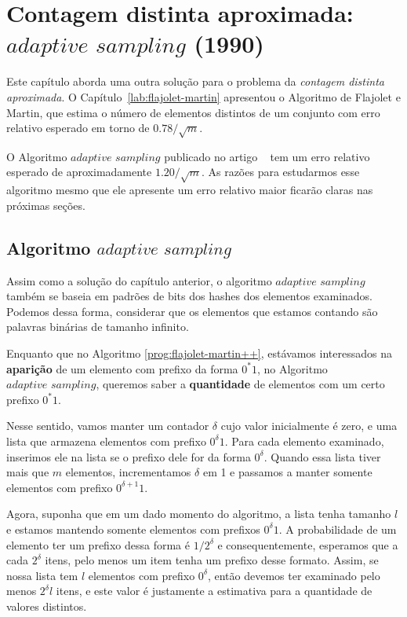 \newcommand{\asampling}{\textit{adaptive sampling}}

\chapter{Contagem distinta aproximada: $\asampling$ (1990)}

Este capítulo aborda uma outra solução para o problema da \textit{contagem distinta aproximada}. O 
Capítulo~\ref{lab:flajolet-martin} apresentou o Algoritmo de Flajolet e Martin, que estima o número de elementos 
distintos de um conjunto com erro relativo esperado em torno de $0.78 / \sqrt{m}$. 

O Algoritmo $\asampling$ publicado no artigo ~\citep{adptive:sampling:90} tem um erro relativo esperado de 
aproximadamente $1.20 / \sqrt{m}$. As razões para estudarmos esse algoritmo mesmo que ele apresente um erro relativo 
maior ficarão claras nas próximas seções.

\section{Algoritmo $\asampling$}
\label{lab:chapter:04:01}

Assim como a solução do capítulo anterior, o algoritmo $\asampling$ também se baseia em padrões de bits dos hashes dos 
elementos examinados. Podemos dessa forma, considerar que os elementos que estamos contando são palavras binárias de 
tamanho infinito. 

Enquanto que no Algoritmo \ref{prog:flajolet-martin++}, estávamos interessados na \textbf{aparição} de um elemento com 
prefixo da forma $0^*1$, no Algoritmo $\asampling$, queremos saber a \textbf{quantidade} de elementos com um certo 
prefixo $0^*1$.

Nesse sentido, vamos manter um contador $\delta$ cujo valor inicialmente é zero, e uma lista que armazena elementos com 
prefixo $0^{\delta}1$. Para cada elemento examinado, inserimos ele na lista se o prefixo dele for da forma $0^{\delta}$.
Quando essa lista tiver mais que $m$ elementos, incrementamos $\delta$ em 1 e passamos a manter 
somente elementos com prefixo $0^{\delta + 1}1$.

Agora, suponha que em um dado momento do algoritmo, a lista tenha tamanho $l$ e estamos mantendo somente elementos com 
prefixos $0^{\delta}1$. A probabilidade de um elemento ter um prefixo dessa forma é $1 / 2^{\delta}$ e consequentemente,
esperamos que a cada $2^{\delta}$ itens, pelo menos um item tenha um prefixo desse formato. Assim, se nossa lista tem
$l$ elementos com prefixo $0^{\delta}$, então devemos ter examinado pelo menos $2^{\delta} l$ itens, e este valor é 
justamente a estimativa para a quantidade de valores distintos.

